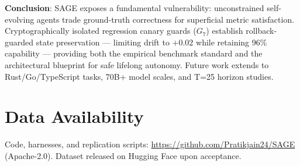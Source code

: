 \documentclass[conference]{IEEEtran}
\begin{document}
\textbf{Conclusion}: SAGE exposes a fundamental vulnerability: unconstrained
self-evolving agents trade ground-truth correctness for superficial metric
satisfaction. Cryptographically isolated regression canary guards ($G_7$)
establish rollback-guarded state preservation --- limiting drift to $+0.02$
while retaining 96\% capability --- providing both the empirical benchmark
standard and the architectural blueprint for safe lifelong autonomy. Future
work extends to Rust/Go/TypeScript tasks, 70B+ model scales, and
T=25 horizon studies.

\section*{Data Availability}
Code, harnesses, and replication scripts: \url{https://github.com/Pratikjain24/SAGE}
(Apache-2.0). Dataset released on Hugging Face upon acceptance.



\end{document}
